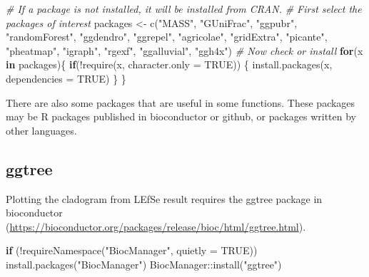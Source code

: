 \documentclass[
]{book}
\newenvironment{Shaded}{\begin{snugshade}}{\end{snugshade}}
\newcommand{\AttributeTok}[1]{\textcolor[rgb]{0.77,0.63,0.00}{#1}}
\newcommand{\CommentTok}[1]{\textcolor[rgb]{0.56,0.35,0.01}{\textit{#1}}}
\newcommand{\ConstantTok}[1]{\textcolor[rgb]{0.00,0.00,0.00}{#1}}
\newcommand{\ControlFlowTok}[1]{\textcolor[rgb]{0.13,0.29,0.53}{\textbf{#1}}}
\newcommand{\FunctionTok}[1]{\textcolor[rgb]{0.00,0.00,0.00}{#1}}
\newcommand{\NormalTok}[1]{#1}
\newcommand{\OtherTok}[1]{\textcolor[rgb]{0.56,0.35,0.01}{#1}}
\newcommand{\SpecialCharTok}[1]{\textcolor[rgb]{0.00,0.00,0.00}{#1}}
\newcommand{\StringTok}[1]{\textcolor[rgb]{0.31,0.60,0.02}{#1}}
\begin{document}
\begin{Shaded}
\begin{Highlighting}[]
\CommentTok{\# If a package is not installed, it will be installed from CRAN.}
\CommentTok{\# First select the packages of interest}
\NormalTok{packages }\OtherTok{\textless{}{-}} \FunctionTok{c}\NormalTok{(}\StringTok{"MASS"}\NormalTok{, }\StringTok{"GUniFrac"}\NormalTok{, }\StringTok{"ggpubr"}\NormalTok{, }\StringTok{"randomForest"}\NormalTok{, }\StringTok{"ggdendro"}\NormalTok{, }\StringTok{"ggrepel"}\NormalTok{, }\StringTok{"agricolae"}\NormalTok{, }\StringTok{"gridExtra"}\NormalTok{, }\StringTok{"picante"}\NormalTok{, }\StringTok{"pheatmap"}\NormalTok{, }\StringTok{"igraph"}\NormalTok{, }\StringTok{"rgexf"}\NormalTok{, }\StringTok{"ggalluvial"}\NormalTok{, }\StringTok{"ggh4x"}\NormalTok{)}
\CommentTok{\# Now check or install}
\ControlFlowTok{for}\NormalTok{(x }\ControlFlowTok{in}\NormalTok{ packages)\{}
    \ControlFlowTok{if}\NormalTok{(}\SpecialCharTok{!}\FunctionTok{require}\NormalTok{(x, }\AttributeTok{character.only =} \ConstantTok{TRUE}\NormalTok{)) \{}
        \FunctionTok{install.packages}\NormalTok{(x, }\AttributeTok{dependencies =} \ConstantTok{TRUE}\NormalTok{)}
\NormalTok{    \}}
\NormalTok{\}}
\end{Highlighting}
\end{Shaded}

There are also some packages that are useful in some functions. These packages may be R packages published in bioconductor or github,
or packages written by other languages.

\hypertarget{ggtree}{%
\subsection{ggtree}\label{ggtree}}

Plotting the cladogram from LEfSe result requires the ggtree package in bioconductor (\url{https://bioconductor.org/packages/release/bioc/html/ggtree.html}).

\begin{Shaded}
\begin{Highlighting}[]
\ControlFlowTok{if}\NormalTok{ (}\SpecialCharTok{!}\FunctionTok{requireNamespace}\NormalTok{(}\StringTok{"BiocManager"}\NormalTok{, }\AttributeTok{quietly =} \ConstantTok{TRUE}\NormalTok{)) }\FunctionTok{install.packages}\NormalTok{(}\StringTok{"BiocManager"}\NormalTok{)}
\NormalTok{BiocManager}\SpecialCharTok{::}\FunctionTok{install}\NormalTok{(}\StringTok{"ggtree"}\NormalTok{)}
\end{Highlighting}
\end{Shaded}
\end{document}
